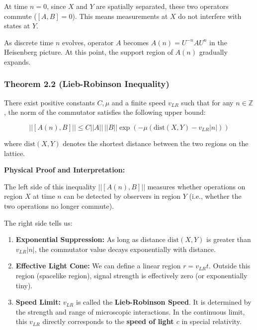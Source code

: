 At time \textbf{$n=0$}, since \textbf{$X$} and \textbf{$Y$} are spatially separated, these two operators commute (\textbf{$[A, B] = 0$}). This means measurements at \textbf{$X$} do not interfere with states at \textbf{$Y$}.

As discrete time \textbf{$n$} evolves, operator \textbf{$A$} becomes \textbf{$A(n) = U^{-n} A U^n$} in the Heisenberg picture. At this point, the support region of \textbf{$A(n)$} gradually expands.

\subsubsection{Theorem 2.2 (Lieb-Robinson Inequality)}

There exist positive constants \textbf{$C, \mu$} and a finite speed \textbf{$v_{LR}$} such that for any \textbf{$n \in \mathbb{Z}$}, the norm of the commutator satisfies the following upper bound:

$$|| [A(n), B] || \le C ||A|| \, ||B|| \exp\left(-\mu \left( \text{dist}(X, Y) - v_{LR} |n| \right)\right)$$

where \textbf{$\text{dist}(X, Y)$} denotes the shortest distance between the two regions on the lattice.

\textbf{Physical Proof and Interpretation:}

The left side of this inequality \textbf{$|| [A(n), B] ||$} measures whether operations on region \textbf{$X$} at time \textbf{$n$} can be detected by observers in region \textbf{$Y$} (i.e., whether the two operations no longer commute).

The right side tells us:

\begin{enumerate}
\item \textbf{Exponential Suppression:} As long as distance \textbf{$\text{dist}(X, Y)$} is greater than \textbf{$v_{LR} |n|$}, the commutator value decays exponentially with distance.

\item \textbf{Effective Light Cone:} We can define a linear region \textbf{$r = v_{LR} t$}. Outside this region (spacelike region), signal strength is effectively zero (or exponentially tiny).

\item \textbf{Speed Limit:} \textbf{$v_{LR}$} is called the \textbf{Lieb-Robinson Speed}. It is determined by the strength and range of microscopic interactions. In the continuous limit, this \textbf{$v_{LR}$} directly corresponds to the \textbf{speed of light $c$} in special relativity.
\end{enumerate}

